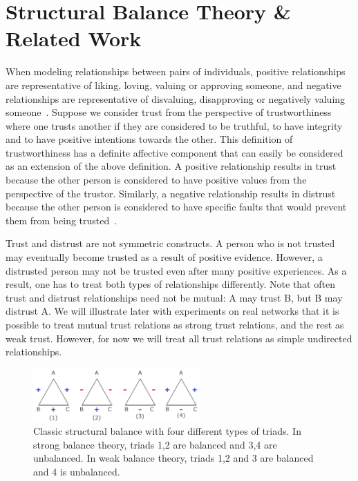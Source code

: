 \documentclass[acmtweb]{acmsmall}
\begin{document}
\section{Structural Balance Theory \& Related Work} 
When modeling relationships between pairs of individuals, positive
relationships are representative of liking, loving, valuing or
approving someone, and negative relationships are representative of
disvaluing, disapproving or negatively valuing
someone~\cite{Cartwright:56}. Suppose we consider trust from the
perspective of trustworthiness where one trusts another if they are
considered to be truthful, to have integrity and to have positive
intentions towards the other. This definition of trustworthiness has a
definite affective component that can easily be considered as an
extension of the above definition. A positive relationship results in
trust because the other person is considered to have positive values
from the perspective of the trustor. Similarly, a negative
relationship results in distrust because the other person is
considered to have specific faults that would prevent them from being
trusted~\cite{Adali:2013}.

Trust and distrust are not symmetric constructs. A person who is not
trusted may eventually become trusted as a result of positive
evidence. However, a distrusted person may not be trusted even after
many positive experiences. As a result, one has to treat both types of
relationships differently. Note that often trust and distrust
relationships need not be mutual: A may trust B, but B may distrust A.
We will illustrate later with experiments on real networks that it is
possible to treat mutual trust relations as strong trust relations,
and the rest as weak trust. However, for now we will treat all trust
relations as simple undirected relationships.

\begin{figure}[th]
\centering
\includegraphics[height=0.8in]{strongBalance_ver.pdf}
\vspace*{-0.1in}
\caption{\label{fig:balance_strong}Classic structural balance with
  four different types of triads. In strong balance theory, triads 1,2
  are balanced and 3,4 are unbalanced. In weak balance theory, triads
  1,2 and 3 are balanced and 4 is unbalanced.}
\end{figure}
\end{document}
